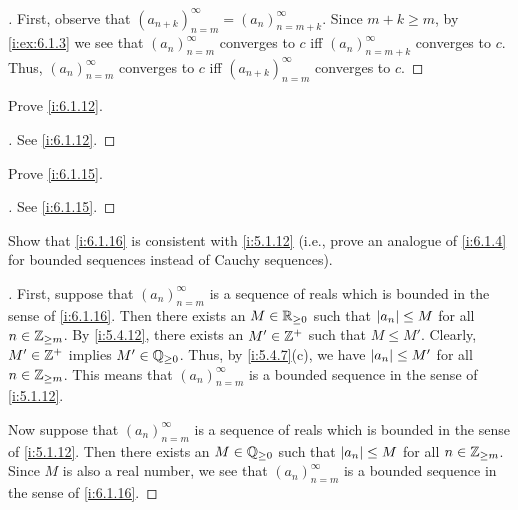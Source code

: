 \begin{proof}[]
  First, observe that \((a_{n + k})_{n = m}^\infty = (a_n)_{n = m + k}^\infty\).
  Since \(m + k \geq m\), by \cref{i:ex:6.1.3} we see that \((a_n)_{n = m}^\infty\) converges to \(c\) iff \((a_n)_{n = m + k}^\infty\) converges to \(c\).
  Thus, \((a_n)_{n = m}^\infty\) converges to \(c\) iff \((a_{n + k})_{n = m}^\infty\) converges to \(c\).
\end{proof}

\begin{ex}\label{i:ex:6.1.5}
  Prove \cref{i:6.1.12}.
\end{ex}

\begin{proof}[]
  See \cref{i:6.1.12}.
\end{proof}

\begin{ex}\label{i:ex:6.1.6}
  Prove \cref{i:6.1.15}.
\end{ex}

\begin{proof}[]
  See \cref{i:6.1.15}.
\end{proof}

\begin{ex}\label{i:ex:6.1.7}
  Show that \cref{i:6.1.16} is consistent with \cref{i:5.1.12}
  (i.e., prove an analogue of \cref{i:6.1.4} for bounded sequences instead of Cauchy sequences).
\end{ex}

\begin{proof}[]
  First, suppose that \((a_n)_{n = m}^\infty\) is a sequence of reals which is bounded in the sense of \cref{i:6.1.16}.
  Then there exists an \(M \in \mathbb{R}_{\geq 0}\) such that \(\left\lvert a_n\right\rvert \leq M\) for all \(n \in \mathbb{Z}_{\geq m}\).
  By \cref{i:5.4.12}, there exists an \(M' \in \mathbb{Z}^+\) such that \(M \leq M'\).
  Clearly, \(M' \in \mathbb{Z}^+\) implies \(M' \in \mathbb{Q}_{\geq 0}\).
  Thus, by \cref{i:5.4.7}(c), we have \(\left\lvert a_n\right\rvert \leq M'\) for all \(n \in \mathbb{Z}_{\geq m}\).
  This means that \((a_n)_{n = m}^\infty\) is a bounded sequence in the sense of \cref{i:5.1.12}.

  Now suppose that \((a_n)_{n = m}^\infty\) is a sequence of reals which is bounded in the sense of \cref{i:5.1.12}.
  Then there exists an \(M \in \mathbb{Q}_{\geq 0}\) such that \(\left\lvert a_n\right\rvert \leq M\) for all \(n \in \mathbb{Z}_{\geq m}\).
  Since \(M\) is also a real number, we see that \((a_n)_{n = m}^\infty\) is a bounded sequence in the sense of \cref{i:6.1.16}.
\end{proof}

